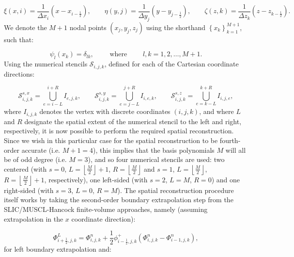 \documentclass{article}
\begin{document}
\begin{equation}
\xi \left( x, i \right) = \frac{1}{\Delta x_i} \left( x - x_{i - \frac{1}{2}} \right), \qquad \eta \left( y, j \right) = \frac{1}{\Delta y_j} \left( y - y_{j - \frac{1}{2}} \right), \qquad \zeta \left( z, k \right) = \frac{1}{\Delta z_k} \left( z - z_{k - \frac{1}{2}} \right).
\end{equation}
We denote the ${M + 1}$ nodal points ${\left( x_j, y_j, z_j \right)}$ using the shorthand ${\left\lbrace x_k \right\rbrace_{k = 1}^{M + 1}}$, such that:

\begin{equation}
\psi_{l} \left( x_k \right) = \delta_{l k}, \qquad \text{ where } \qquad l, k = 1, 2, \dots, M + 1.
\end{equation}
Using the numerical stencils ${\mathcal{S}_{i, j, k}}$, defined for each of the Cartesian coordinate directions:

\begin{equation}
\mathcal{S}_{i, j, k}^{s, x} = \bigcup_{e = i - L}^{i + R} I_{e, j, k}, \qquad \mathcal{S}_{i, j, k}^{s, y} = \bigcup_{e = j - L}^{j + R} I_{i, e, k}, \qquad \mathcal{S}_{i, j, k}^{s, z} = \bigcup_{e = k - L}^{k + R} I_{i, j, e},
\end{equation}
where ${I_{i, j, k}}$ denotes the vertex with discrete coordinates ${\left( i, j, k \right)}$, and where $L$ and $R$ designate the spatial extent of the numerical stencil to the left and right, respectively, it is now possible to perform the required spatial reconstruction. Since we wish in this particular case for the spatial reconstruction to be fourth-order accurate (i.e. ${M + 1 = 4}$), this implies that the basis polynomials $M$ will all be of odd degree (i.e. ${M = 3}$), and so four numerical stencils are used: two centered (with ${s = 0}$, ${L = \left\lfloor \frac{M}{2} \right\rfloor + 1}$, ${R = \left\lfloor \frac{M}{2} \right\rfloor}$ and ${s = 1}$, ${L = \left\lfloor \frac{M}{2} \right\rfloor}$, ${R = \left\lfloor \frac{M}{2} \right\rfloor + 1}$, respectively), one left-sided (with ${s = 2}$, ${L = M}$, ${R = 0}$) and one right-sided (with ${s = 3}$, ${L = 0}$, ${R = M}$). The spatial reconstruction procedure itself works by taking the second-order boundary extrapolation step from the SLIC/MUSCL-Hancock finite-volume approaches\cite{sweby}\cite{toro}, namely (assuming extrapolation in the $x$ coordinate direction):

\begin{equation}
\Phi_{i + \frac{1}{2}, j, k}^{L} = \Phi_{i, j, k}^{n} + \frac{1}{2} \phi_{i - \frac{1}{2}, j, k}^{+} \left( \Phi_{i, j, k}^{n} - \Phi_{i - 1, j, k}^{n} \right),
\end{equation}
for left boundary extrapolation and:
\end{document}
